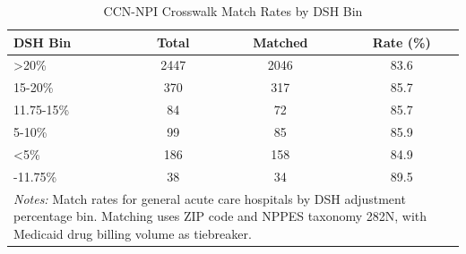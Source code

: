 \begin{table}[!h]
\centering
\caption{\label{tab:tab:crosswalk}CCN-NPI Crosswalk Match Rates by DSH Bin}
\centering
\begin{tabular}[t]{lccc}
\toprule
DSH Bin & Total & Matched & Rate (\%)\\
\midrule
>20\% & 2447 & 2046 & 83.6\\
15-20\% & 370 & 317 & 85.7\\
11.75-15\% & 84 & 72 & 85.7\\
5-10\% & 99 & 85 & 85.9\\
<5\% & 186 & 158 & 84.9\\
\addlinespace
10-11.75\% & 38 & 34 & 89.5\\
\bottomrule
\multicolumn{4}{l}{\rule{0pt}{1em}\textit{Notes:} Match rates for general acute care hospitals by DSH adjustment percentage bin. Matching uses ZIP code and NPPES taxonomy 282N, with Medicaid drug billing volume as tiebreaker.}\\
\end{tabular}
\end{table}

